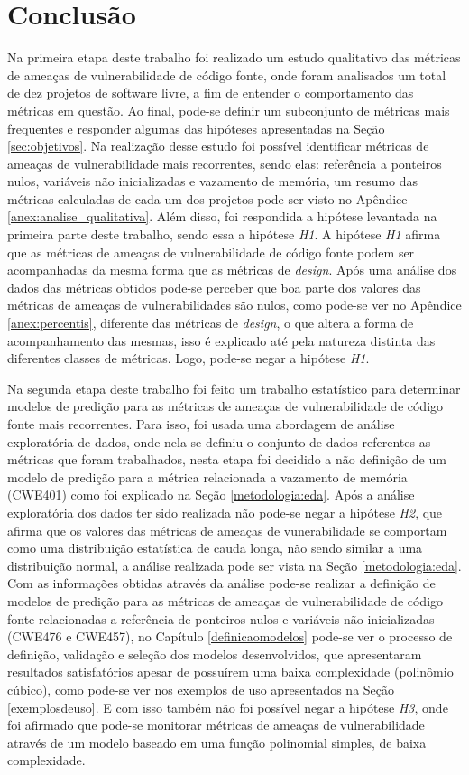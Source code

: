 \chapter{Conclusão} \label{chap:conclusao}

Na primeira etapa deste trabalho foi realizado um estudo qualitativo das
métricas de ameaças de vulnerabilidade de código fonte, onde foram analisados um
total de dez projetos de software livre, a fim de entender o comportamento das
métricas em questão. Ao final, pode-se definir um subconjunto de métricas mais
frequentes e responder algumas das hipóteses apresentadas na Seção
\ref{sec:objetivos}. Na realização desse estudo foi possível identificar
métricas de ameaças de vulnerabilidade mais recorrentes, sendo elas: referência
a ponteiros nulos, variáveis não inicializadas e vazamento de memória, um resumo
das métricas calculadas de cada um dos projetos pode ser visto no Apêndice
\ref{anex:analise_qualitativa}. Além disso, foi respondida a hipótese levantada
na primeira parte deste trabalho, sendo essa a hipótese \textit{H1}. A hipótese
\textit{H1} afirma que as métricas de ameaças de vulnerabilidade de código fonte
podem ser acompanhadas da mesma forma que as métricas de \textit{design}.
Após uma análise dos dados das métricas obtidos pode-se perceber que boa parte
dos valores das métricas de ameaças de vulnerabilidades são nulos, como pode-se
ver no Apêndice \ref{anex:percentis}, diferente das métricas de \textit{design},
o que altera a forma de acompanhamento das mesmas, isso é explicado até pela
natureza distinta das diferentes classes de métricas. Logo, pode-se negar a
hipótese \textit{H1}.

Na segunda etapa deste trabalho foi feito um trabalho estatístico para
determinar modelos de predição para as métricas de ameaças de vulnerabilidade de
código fonte mais recorrentes. Para isso, foi usada uma abordagem de análise
exploratória de dados, onde nela se definiu o conjunto de dados referentes as
métricas que foram trabalhados, nesta etapa foi decidido a não definição de um
modelo de predição para a métrica relacionada a vazamento de memória (CWE401)
como foi explicado na Seção \ref{metodologia:eda}. Após a análise exploratória
dos dados ter sido realizada não pode-se negar a hipótese \textit{H2}, que
afirma que os valores das métricas de ameaças de vunerabilidade se comportam
como uma distribuição estatística de cauda longa, não sendo similar a uma
distribuição normal, a análise realizada pode ser vista na Seção
\ref{metodologia:eda}. Com as informações obtidas através da análise pode-se
realizar a definição de modelos de predição para as métricas de ameaças de
vulnerabilidade de código fonte relacionadas a referência de ponteiros nulos e
variáveis não inicializadas (CWE476 e CWE457), no Capítulo \ref{definicaomodelos}
pode-se ver o processo de definição, validação e seleção dos modelos
desenvolvidos, que apresentaram resultados satisfatórios apesar de possuírem uma
baixa complexidade (polinômio cúbico), como pode-se ver nos exemplos de uso
apresentados na Seção \ref{exemplosdeuso}. E com isso também não foi possível
negar a hipótese \textit{H3}, onde foi afirmado que pode-se monitorar métricas
de ameaças de vulnerabilidade através de um modelo baseado em uma função
polinomial simples, de baixa complexidade.

